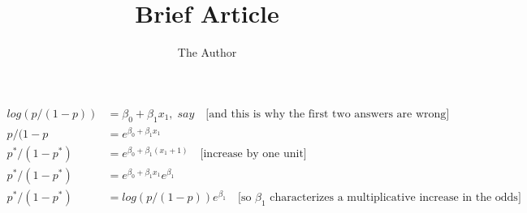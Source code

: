 \documentclass[11pt, oneside]{article}   	%
\title{Brief Article}
\author{The Author}
\begin{document}
\maketitle

\begin{align*}
  log(p/(1-p)) &= \beta_0 + \beta_1x_1,\; say \quad \text{[and this is why the first two answers are wrong]} \\
  p/(1-p &= e^{\beta_0 + \beta_1x_1}\\
  p^*/(1-p^*) &= e^{\beta_0 + \beta_1(x_1+1)} \quad \text{[increase by one unit]}\\
  p^*/(1-p^*) &= e^{\beta_0 + \beta_1x_1}e^{\beta_1} \\
    p^*/(1-p^*) &=  log(p/(1-p)) e^{\beta_1} \quad \text{[so $\beta_1$ characterizes a multiplicative increase in the odds]}\\
\end{align*}
\end{document}
